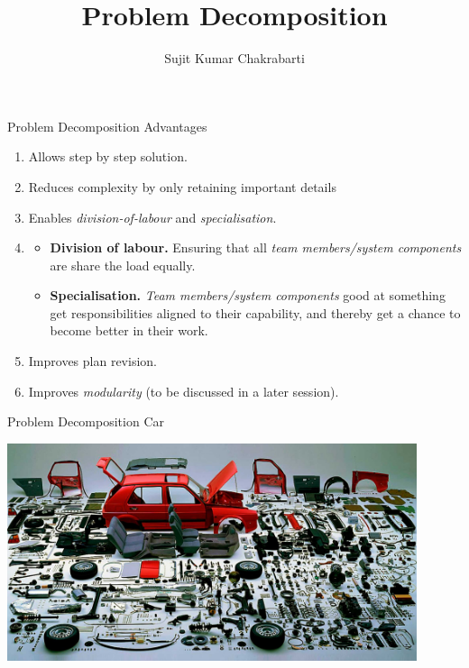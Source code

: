 \documentclass{beamer}
\title[Sujit]{Problem Decomposition}
\author{Sujit Kumar Chakrabarti}
\institute{}
\date{}
\begin{document}
\maketitle

\begin{frame}[fragile]{Problem Decomposition}
{Advantages}

\begin{enumerate}
\item Allows step by step solution.
\item Reduces complexity by only retaining important details
\item Enables \emph{division-of-labour} and \emph{specialisation}.
\item
\begin{scriptsize}
\begin{itemize}
\item \textbf{Division of labour.} Ensuring that all \emph{team members/system components} are share the load equally.
\item \textbf{Specialisation.} \emph{Team members/system components} good at something get responsibilities aligned to their capability, and thereby get a chance to become better in their work.
\end{itemize}
\end{scriptsize}
\item Improves plan revision.
\item Improves \emph{modularity} (to be discussed in a later session).
\end{enumerate}
\end{frame}

\begin{frame}[fragile]{Problem Decomposition}
{Car}

\begin{center}
\includegraphics[width=0.9\textwidth]{images/car-parts.jpg}
\end{center}
\end{frame}
\end{document}
